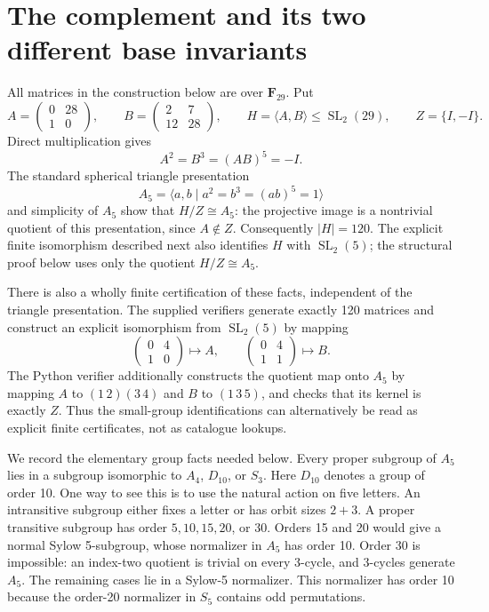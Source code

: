 \documentclass[11pt]{article}
\theoremstyle{remark}\newtheorem{remark}[theorem]{Remark}
\newcommand{\F}{\mathbf F}
\newcommand{\SL}{\operatorname{SL}}
\begin{document}
\section{The complement and its two different base invariants}
All matrices in the construction below are over $\F_{29}$. Put
\[
 A=\begin{pmatrix}0&28\\1&0\end{pmatrix},\qquad
 B=\begin{pmatrix}2&7\\12&28\end{pmatrix},\qquad
 H=\langle A,B\rangle\le\SL_2(29),\qquad Z=\{I,-I\}.
\]
Direct multiplication gives
\begin{equation}\label{eq:triangle}
 A^2=B^3=(AB)^5=-I.
\end{equation}
The standard spherical triangle presentation
\[
 A_5=\langle a,b\mid a^2=b^3=(ab)^5=1\rangle
\]
and simplicity of $A_5$ show that $H/Z\cong A_5$: the projective image is a
nontrivial quotient of this presentation, since $A\notin Z$. Consequently
$|H|=120$. The explicit finite isomorphism described next also identifies $H$ with
$\SL_2(5)$; the structural proof below uses only the quotient $H/Z\cong A_5$.

There is also a wholly finite certification of these facts, independent of
the triangle presentation. The supplied verifiers generate exactly 120
matrices and construct an explicit isomorphism from $\SL_2(5)$ by mapping
\[
 \begin{pmatrix}0&4\\1&0\end{pmatrix}\longmapsto A,
 \qquad
 \begin{pmatrix}0&4\\1&1\end{pmatrix}\longmapsto B.
\]
The Python verifier additionally constructs the quotient map onto $A_5$ by
mapping $A$ to $(1\,2)(3\,4)$ and $B$ to $(1\,3\,5)$, and checks that its
kernel is exactly $Z$. Thus the small-group identifications can alternatively
be read as explicit finite certificates, not as catalogue lookups.

We record the elementary group facts needed below. Every proper subgroup of
$A_5$ lies in a subgroup isomorphic to $A_4$, $D_{10}$, or $S_3$. Here $D_{10}$
denotes a group of order 10. One way to see this is to use the natural action
on five letters. An intransitive subgroup either fixes a letter or has orbit
sizes $2+3$. A proper transitive subgroup has order $5,10,15,20$, or $30$.
Orders 15 and 20 would give a normal Sylow 5-subgroup, whose normalizer in
$A_5$ has order 10. Order 30 is impossible: an index-two quotient is trivial
on every 3-cycle, and 3-cycles generate $A_5$. The remaining cases lie in a
Sylow-5 normalizer. This normalizer has order 10 because the order-20
normalizer in $S_5$ contains odd permutations.
\end{document}
